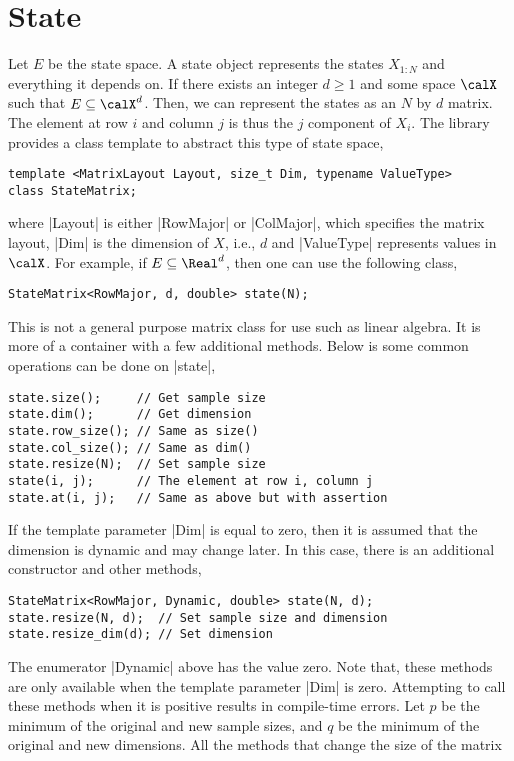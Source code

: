 \section{State}
\label{sec:State}

Let $E$ be the state space. A state object represents the states $X_{1:N}$ and
everything it depends on. If there exists an integer $d\ge1$ and some space
$\calX$ such that $E\subseteq\calX^d$. Then, we can represent the states as an
$N$ by $d$ matrix. The element at row $i$ and column $j$ is thus the $j$\ith
component of $X_i$. The library provides a class template to abstract this type
of state space,
\begin{verbatim}
template <MatrixLayout Layout, size_t Dim, typename ValueType>
class StateMatrix;
\end{verbatim}
where |Layout| is either |RowMajor| or |ColMajor|, which specifies the matrix
layout, |Dim| is the dimension of $X$, i.e., $d$ and |ValueType| represents
values in $\calX$. For example, if $E\subseteq\Real^d$, then one can use the
following class,
\begin{verbatim}
StateMatrix<RowMajor, d, double> state(N);
\end{verbatim}
This is not a general purpose matrix class for use such as linear algebra. It
is more of a container with a few additional methods. Below is some common
operations can be done on |state|,
\begin{verbatim}
state.size();     // Get sample size
state.dim();      // Get dimension
state.row_size(); // Same as size()
state.col_size(); // Same as dim()
state.resize(N);  // Set sample size
state(i, j);      // The element at row i, column j
state.at(i, j);   // Same as above but with assertion
\end{verbatim}
If the template parameter |Dim| is equal to zero, then it is assumed that the
dimension is dynamic and may change later. In this case, there is an additional
constructor and other methods,
\begin{verbatim}
StateMatrix<RowMajor, Dynamic, double> state(N, d);
state.resize(N, d);  // Set sample size and dimension
state.resize_dim(d); // Set dimension
\end{verbatim}
The enumerator |Dynamic| above has the value zero. Note that, these methods are
only available when the template parameter |Dim| is zero. Attempting to call
these methods when it is positive results in compile-time errors. Let $p$ be
the minimum of the original and new sample sizes, and $q$ be the minimum of the
original and new dimensions. All the methods that change the size of the matrix
